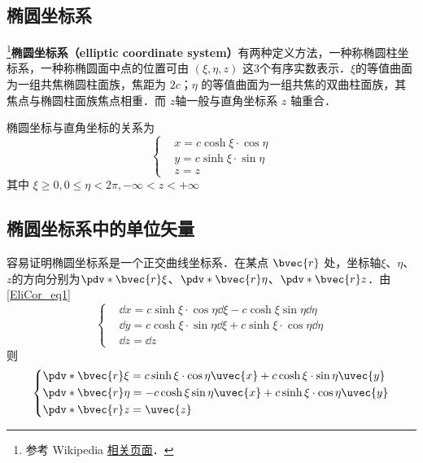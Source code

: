 
\begin{issues}
\issueDraft
\end{issues}


\subsection{椭圆坐标系}
\footnote{参考 Wikipedia \href{https://en.wikipedia.org/wiki/Elliptic_coordinate_system}{相关页面}．}\textbf{椭圆坐标系（elliptic coordinate system）}有两种定义方法，一种称椭圆柱坐标系，一种称椭圆面中点的位置可由 $(\xi,\eta,z)$ 这3个有序实数表示．$\xi$的等值曲面为一组共焦椭圆柱面族，焦距为 $2c$；$\eta$ 的等值曲面为一组共焦的双曲柱面族，其焦点与椭圆柱面族焦点相重．而 $z$轴一般与直角坐标系 $z$ 轴重合．

椭圆坐标与直角坐标的关系为
\begin{equation}\label{EliCor_eq1}
\left\{\begin{aligned}
&x=c\cosh\xi\cdot\cos\eta\\
&y=c\sinh\xi\cdot\sin\eta\\
&z=z
\end{aligned}\right.
\end{equation}
其中 $\xi\geq0,0\leq\eta<2\pi,-\infty<z<+\infty$
\subsection{椭圆坐标系中的单位矢量}
容易证明椭圆坐标系是一个正交曲线坐标系．在某点 $\bvec{r}$ 处，坐标轴$\xi$、$\eta$、$z$的方向分别为$\pdv*{\bvec{r}}{\xi}$、$\pdv*{\bvec{r}}{\eta}$、$\pdv*{\bvec{r}}{z}$．由\autoref{EliCor_eq1} 
\begin{equation}\label{EliCor_eq2}
\left\{
    \begin{aligned}
    &\dd x=c\sinh\xi\cdot\cos\eta\dd\xi-c\cosh\xi\sin\eta\dd\eta\\
    &\dd y=c\cosh\xi\cdot\sin\eta\dd\xi+c\sinh\xi\cdot\cos\eta\dd\eta\\
    &\dd z=\dd z
    \end{aligned}\right.
\end{equation}
则
\begin{equation}
\left\{
    \begin{aligned}
&\pdv*{\bvec{r}}{\xi}=c\sinh\xi\cdot\cos\eta\uvec{x}+c\cosh\xi\cdot\sin\eta\uvec{y}\\
&\pdv*{\bvec{r}}{\eta}=-c\cosh\xi\sin\eta\uvec{x}+c\sinh\xi\cdot\cos\eta\uvec{y}\\
&\pdv*{\bvec{r}}{z}=\uvec{z}
    \end{aligned}\right.
\end{equation}

